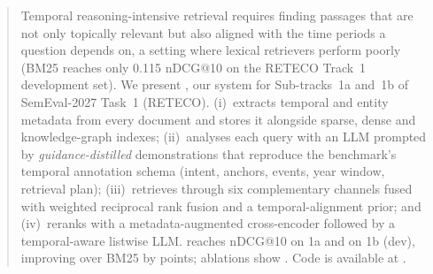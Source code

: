 \begin{abstract}
Temporal reasoning-intensive retrieval requires finding passages that are not only topically
relevant but also aligned with the time periods a question depends on, a setting where lexical
retrievers perform poorly (BM25 reaches only 0.115 nDCG@10 on the RETECO Track~1 development set).
We present \sys, our system for Sub-tracks~1a and~1b of SemEval-2027 Task~1 (RETECO).
\sys (i)~extracts temporal and entity metadata from every document and stores it alongside
sparse, dense and knowledge-graph indexes; (ii)~analyses each query with an LLM prompted by
\emph{guidance-distilled} demonstrations that reproduce the benchmark's temporal annotation schema
(intent, anchors, events, year window, retrieval plan); (iii)~retrieves through six complementary
channels fused with weighted reciprocal rank fusion and a temporal-alignment prior; and
(iv)~reranks with a metadata-augmented cross-encoder followed by a temporal-aware listwise LLM.
\sys reaches  nDCG@10 on 1a and  on 1b (dev), improving over BM25 by
 points; ablations show . Code is available at .
\end{abstract}
